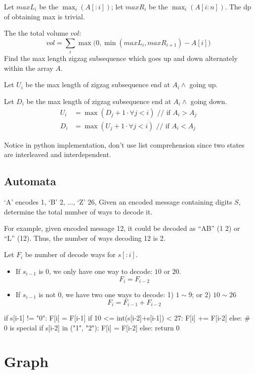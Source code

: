 {Let $maxL_i$ be the $\max_{i}(A[:i])$; let $maxR_i$ be the $\max_{i}(A[i:n])$. The dp of obtaining max is trivial. 

The the total volume $vol$:
$$
vol = \sum_i\max\big(0,\min(maxL_i, maxR_{i+1})-A[i]\big)
$$
 Find the max length zigzag subsequence which goes up and down alternately within the array $A$.

Let $U_i$ be the max length of zigzag subsequence end at $A_i \wedge$ going up.

Let $D_i$ be the max length of zigzag subsequence end at $A_i \wedge$ going down.
\begin{align*}
U_i &= \max(D_j+1 \cdot \forall j < i) \text{ // if $A_i > A_j$} \\ 
D_i &= \max(U_j+1 \cdot \forall j < i) \text{ // if $A_i < A_j$} 
\end{align*}

Notice in python implementation, don't use list comprehension since two states are interleaved and interdependent. 
\subsection{Automata}
 `A' encodes 1, `B' 2, ..., `Z' 26, Given an encoded message containing digits $S$, determine the total number of ways to decode it.

For example, given encoded message 12, it could be decoded as ``AB'' (1 2) or ``L'' (12). Thus, the number of ways decoding 12 is 2.

Let $F_i$ be number of decode ways for $s[:i]$. 

\begin{itemize}
\item If $s_{i-1}$ is 0, we only have one way to decode: $10$ or $20$.
$$
F_i = F_{i-2}
$$ 
\item If $s_{i-1}$ is not 0, we have two one ways to decode: 1) $1 \sim 9$; or 2) $10 \sim26$
$$
F_i = F_{i-1}+F_{i-2}
$$
\end{itemize}
\begin{python}
if s[i-1] != "0":
    F[i] = F[i-1]
    if 10 <= int(s[i-2]+s[i-1]) < 27:
        F[i] += F[i-2]
else:  # 0 is special
    if s[i-2] in ("1", "2"):
        F[i] = F[i-2]
    else:
        return 0
\end{python}
\section{Graph}
}
